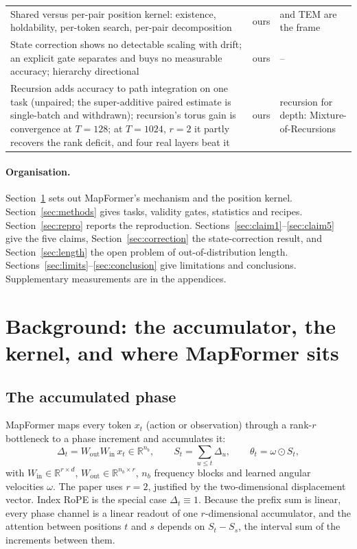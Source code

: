 \documentclass[10pt]{article}
\newcommand{\R}{\mathbb{R}}
\newcommand{\nb}{n_b}
\begin{document}
\begin{table}[t]
\begin{tabular}{@{}p{8.3cm}p{2.2cm}p{3.9cm}@{}}
Shared versus per-pair position kernel: existence, holdability, per-token search, per-pair decomposition & ours & \citet{whittington2025tale} and TEM are the frame \\
State correction shows no detectable scaling with drift; an explicit gate separates and buys no measurable accuracy; hierarchy directional & ours & -- \\
Recursion adds accuracy to path integration on one task (unpaired; the super-additive paired estimate is single-batch and withdrawn); recursion's torus gain is convergence at $T=128$; at $T=1024$, $r=2$ it partly recovers the rank deficit, and four real layers beat it & ours & recursion for depth: Mixture-of-Recursions \\
\bottomrule
\end{tabular}
\end{table}

\paragraph{Organisation.} Section~\ref{sec:background} sets out MapFormer's mechanism and the
position kernel. Section~\ref{sec:methods} gives tasks, validity gates, statistics and recipes.
Section~\ref{sec:repro} reports the reproduction. Sections~\ref{sec:claim1}--\ref{sec:claim5} give
the five claims, Section~\ref{sec:correction} the state-correction result, and
Section~\ref{sec:length} the open problem of out-of-distribution length.
Sections~\ref{sec:limits}--\ref{sec:conclusion} give limitations and conclusions. Supplementary
measurements are in the appendices.

\section{Background: the accumulator, the kernel, and where MapFormer sits}
\label{sec:background}

\subsection{The accumulated phase}

MapFormer maps every token $x_t$ (action or observation) through a rank-$r$ bottleneck to a phase
increment and accumulates it:
\begin{equation}
\Delta_t = W_{\mathrm{out}} W_{\mathrm{in}}\, x_t \in \R^{\nb},\qquad
S_t = \sum_{u\le t} \Delta_u,\qquad
\theta_t = \omega \odot S_t ,
\label{eq:accum}
\end{equation}
with $W_{\mathrm{in}}\in\R^{r\times d}$, $W_{\mathrm{out}}\in\R^{\nb\times r}$, $\nb$ frequency
blocks and learned angular velocities $\omega$. The paper uses $r=2$, justified by the
two-dimensional displacement vector. Index RoPE \citep{su2021roformer} is the special case
$\Delta_t\equiv 1$. Because the prefix sum is linear, every phase channel is a linear readout of one
$r$-dimensional accumulator, and the attention between positions $t$ and $s$ depends on $S_t-S_s$,
the interval sum of the increments between them.
\end{document}
